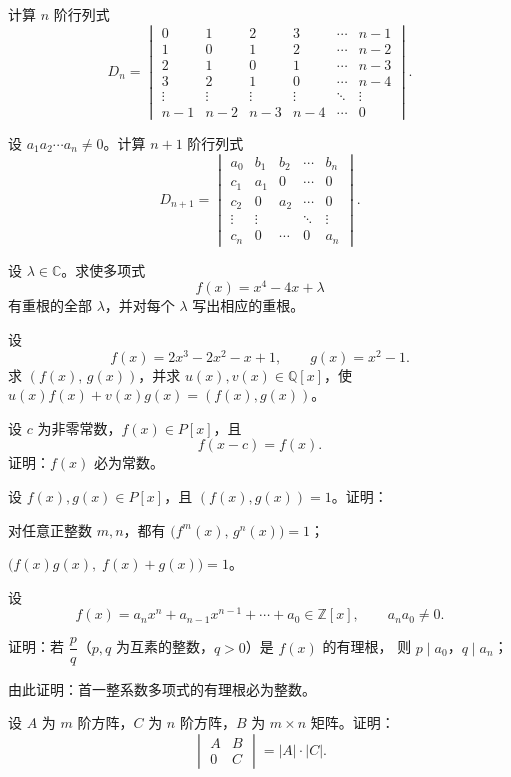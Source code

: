 \documentclass[11pt,a4paper,fontset=windows]{ctexart}
\begin{document}
\begin{qs}
\item 计算 $n$ 阶行列式
\[
D_n=\begin{vmatrix}
0&1&2&3&\cdots&n-1\\
1&0&1&2&\cdots&n-2\\
2&1&0&1&\cdots&n-3\\
3&2&1&0&\cdots&n-4\\
\vdots&\vdots&\vdots&\vdots&\ddots&\vdots\\
n-1&n-2&n-3&n-4&\cdots&0
\end{vmatrix}.
\]

\item 设 $a_1a_2\cdots a_n\neq 0$。计算 $n+1$ 阶行列式
\[
D_{n+1}=\begin{vmatrix}
a_0&b_1&b_2&\cdots&b_n\\
c_1&a_1&0&\cdots&0\\
c_2&0&a_2&\cdots&0\\
\vdots&\vdots&&\ddots&\vdots\\
c_n&0&\cdots&0&a_n
\end{vmatrix}.
\]

\item 设 $\lambda\in\mathbb{C}$。求使多项式
\[
f(x)=x^{4}-4x+\lambda
\]
有重根的全部 $\lambda$，并对每个 $\lambda$ 写出相应的重根。

\item 设
\[
f(x)=2x^{3}-2x^{2}-x+1,\qquad g(x)=x^{2}-1 .
\]
求 $(f(x),\,g(x))$，并求 $u(x),v(x)\in\mathbb{Q}[x]$，使 $u(x)f(x)+v(x)g(x)=(f(x),g(x))$。
\end{qs}

\begin{qs}[resume*]
\item 设 $c$ 为非零常数，$f(x)\in P[x]$，且
\[
f(x-c)=f(x).
\]
证明：$f(x)$ 必为常数。

\item 设 $f(x),g(x)\in P[x]$，且 $(f(x),g(x))=1$。证明：
\begin{sub}
\item 对任意正整数 $m,n$，都有 $\bigl(f^{m}(x),\,g^{n}(x)\bigr)=1$；
\item $\bigl(f(x)g(x),\;f(x)+g(x)\bigr)=1$。
\end{sub}

\item 设
\[
f(x)=a_nx^{n}+a_{n-1}x^{n-1}+\cdots+a_0\in\mathbb{Z}[x],\qquad a_na_0\neq 0 .
\]
\begin{sub}
\item 证明：若 $\dfrac{p}{q}$（$p,q$ 为互素的整数，$q>0$）是 $f(x)$ 的有理根，
      则 $p\mid a_0$，$q\mid a_n$；
\item 由此证明：首一整系数多项式的有理根必为整数。
\end{sub}

\item 设 $A$ 为 $m$ 阶方阵，$C$ 为 $n$ 阶方阵，$B$ 为 $m\times n$ 矩阵。证明：
\[
\begin{vmatrix}
A&B\\[2pt]
0&C
\end{vmatrix}=|A|\cdot|C| .
\]
\end{qs}
\end{document}
